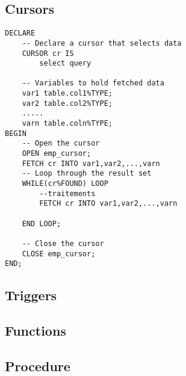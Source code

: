 \subsection{Cursors}
\begin{tcolorbox}[title = cursor]
    \begin{verbatim}
DECLARE
    -- Declare a cursor that selects data
    CURSOR cr IS
        select query

    -- Variables to hold fetched data
    var1 table.col1%TYPE;
    var2 table.col2%TYPE;
    .....
    varn table.coln%TYPE;
BEGIN
    -- Open the cursor
    OPEN emp_cursor;
    FETCH cr INTO var1,var2,...,varn
    -- Loop through the result set
    WHILE(cr%FOUND) LOOP
        --traitements
        FETCH cr INTO var1,var2,...,varn
        
    END LOOP;

    -- Close the cursor
    CLOSE emp_cursor;
END;
    \end{verbatim}
\end{tcolorbox}
\subsection{Triggers}
\subsection{Functions}
\subsection{Procedure}

